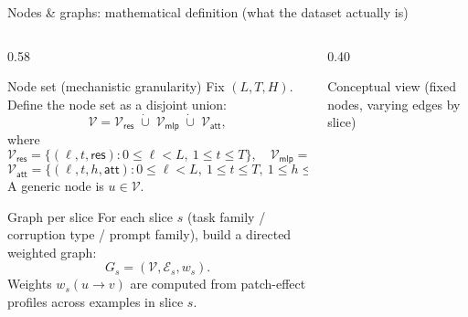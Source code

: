 \documentclass[aspectratio=169,xcolor={dvipsnames}]{beamer}
\begin{document}
\begin{frame}[shrink=34]{Nodes \& graphs: mathematical definition (what the dataset actually is)}
\small
\begin{columns}[T,onlytextwidth]
\begin{column}{0.58\textwidth}
\begin{block}{Node set (mechanistic granularity)}
Fix $(L,T,H)$. Define the node set as a disjoint union:
\[
\mathcal{V}
=
\mathcal{V}_{\textsf{res}}
\;\dot\cup\;
\mathcal{V}_{\textsf{mlp}}
\;\dot\cup\;
\mathcal{V}_{\textsf{att}},
\]
where
\[
\mathcal{V}_{\textsf{res}}=\{(\ell,t,\textsf{res}) : 0\le \ell<L,\ 1\le t\le T\},
\quad
\mathcal{V}_{\textsf{mlp}}=\{(\ell,t,\textsf{mlp}) : 0\le \ell<L,\ 1\le t\le T\},
\]
\[
\mathcal{V}_{\textsf{att}}=\{(\ell,t,h,\textsf{att}) : 0\le \ell<L,\ 1\le t\le T,\ 1\le h\le H\}.
\]
A generic node is $u\in\mathcal{V}$.
\end{block}

\begin{block}{Graph per slice}
For each slice $s$ (task family / corruption type / prompt family), build a directed weighted graph:
\[
G_s = (\mathcal{V},\mathcal{E}_s,w_s).
\]
Weights $w_s(u\!\to\!v)$ are computed from patch-effect profiles across examples in slice $s$.
\end{block}
\end{column}

\begin{column}{0.40\textwidth}
\begin{block}{Conceptual view (fixed nodes, varying edges by slice)}
\centering
{}
\end{block}
\end{column}
\end{columns}
\end{frame}
\end{document}
